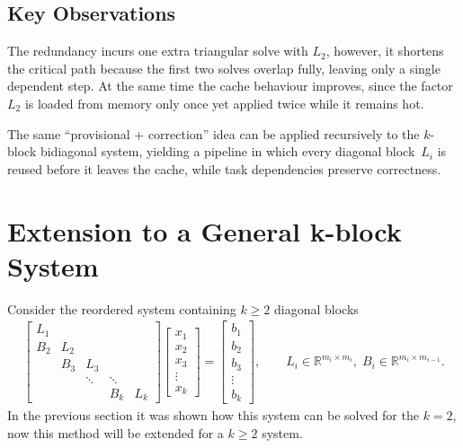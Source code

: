 \subsection{Key Observations}
The redundancy incurs one extra triangular solve with $L_2$, however, it shortens the critical path because the first two solves overlap fully, leaving only a single dependent step. At the same time the cache behaviour improves, since the factor $L_2$ is loaded from memory only once yet applied twice while it remains hot.

The same ``provisional + correction'' idea can be applied recursively to the
$k$-block bidiagonal system, yielding a pipeline in which every diagonal
block~$L_i$ is reused before it leaves the cache, while task dependencies
preserve correctness.

\section{Extension to a General k-block System}
\label{chap:meth_kblock}

Consider the reordered system containing $k\ge 2$ diagonal blocks
\begin{align}
  \begin{bmatrix}
    L_{1} &        &        &        &        \\
    B_{2} & L_{2}  &        &        &        \\
          & B_{3}  & L_{3}  &        &        \\
          &        & \ddots & \ddots &        \\
          &        &        & B_{k}  & L_{k}
  \end{bmatrix}
  \begin{bmatrix}
    x_{1}\\ x_{2}\\ x_{3}\\ \vdots\\ x_{k}
  \end{bmatrix}
  =
  \begin{bmatrix}
    b_{1}\\ b_{2}\\ b_{3}\\ \vdots\\ b_{k}
  \end{bmatrix},
  \qquad
  L_i\in\mathbb{R}^{m_i\times m_i},\;
  B_i\in\mathbb{R}^{m_i\times m_{i-1}} .
  \label{eq:kblock_system}
\end{align}
In the previous section it was shown how this system can be solved for the $k = 2$, now this method will be extended for a $k \geq 2$ system.
